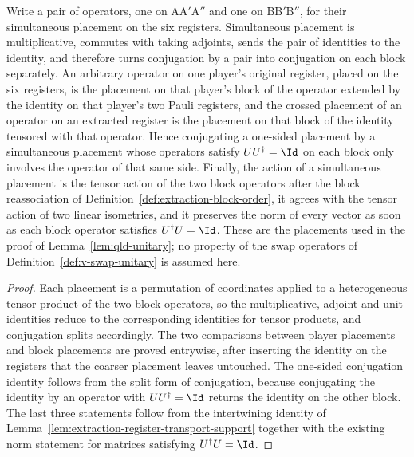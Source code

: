 \begin{lemma}\label{lem:extraction-block-placement-support}
	\leanok
	Write a pair of operators, one on $\mathrm{A}\mathrm{A}'\mathrm{A}''$ and one on $\mathrm{B}\mathrm{B}'\mathrm{B}''$, for their simultaneous placement on the six registers.  Simultaneous placement is multiplicative, commutes with taking adjoints, sends the pair of identities to the identity, and therefore turns conjugation by a pair into conjugation on each block separately.  An arbitrary operator on one player's original register, placed on the six registers, is the placement on that player's block of the operator extended by the identity on that player's two Pauli registers, and the crossed placement of an operator on an extracted register is the placement on that block of the identity tensored with that operator.  Hence conjugating a one-sided placement by a simultaneous placement whose operators satisfy $UU^\dagger = \Id$ on each block only involves the operator of that same side.  Finally, the action of a simultaneous placement is the tensor action of the two block operators after the block reassociation of Definition~\ref{def:extraction-block-order}, it agrees with the tensor action of two linear isometries, and it preserves the norm of every vector as soon as each block operator satisfies $U^\dagger U = \Id$.  These are the placements used in the proof of Lemma~\ref{lem:qld-unitary}; no property of the swap operators of Definition~\ref{def:v-swap-unitary} is assumed here.
\end{lemma}
\begin{proof}
	\leanok
	Each placement is a permutation of coordinates applied to a heterogeneous tensor product of the two block operators, so the multiplicative, adjoint and unit identities reduce to the corresponding identities for tensor products, and conjugation splits accordingly.  The two comparisons between player placements and block placements are proved entrywise, after inserting the identity on the registers that the coarser placement leaves untouched.  The one-sided conjugation identity follows from the split form of conjugation, because conjugating the identity by an operator with $UU^\dagger = \Id$ returns the identity on the other block.  The last three statements follow from the intertwining identity of Lemma~\ref{lem:extraction-register-transport-support} together with the existing norm statement for matrices satisfying $U^\dagger U = \Id$.
\end{proof}
